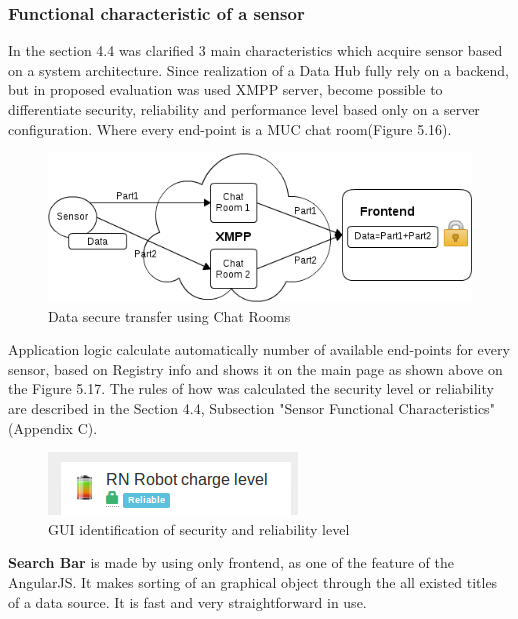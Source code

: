 \subsubsection{Functional characteristic of a sensor}
In the section 4.4 was clarified 3 main characteristics which acquire sensor based on a system architecture. Since realization of a Data Hub fully rely on a backend, but in proposed evaluation was used XMPP server, become possible to differentiate security, reliability and performance level based only on a server configuration. Where every end-point is a MUC chat room(Figure 5.16). 
\begin{figure}[!ht]
\centering
\includegraphics[scale=0.6]{images/security.png}   
\caption[Security]{Data secure transfer using Chat Rooms}                         
\end{figure}
Application logic calculate automatically number of available end-points for every sensor, based on Registry info and shows it on the main page as shown above on the Figure 5.17. The rules of how was calculated the security level or reliability are described in the Section 4.4, Subsection "Sensor Functional Characteristics"(Appendix C).
\newline
\begin{figure}[!ht]
\centering
\includegraphics[scale=1.0]{Screenshots/Icons.png}   
\caption[GUI identification of security and reliability level]{GUI identification of security and reliability level}    
\end{figure}

\textbf{Search Bar} is made by using only frontend, as one of the feature of the AngularJS. It makes sorting of an graphical object through the all existed titles of a data source. It is fast and very straightforward in use. 

